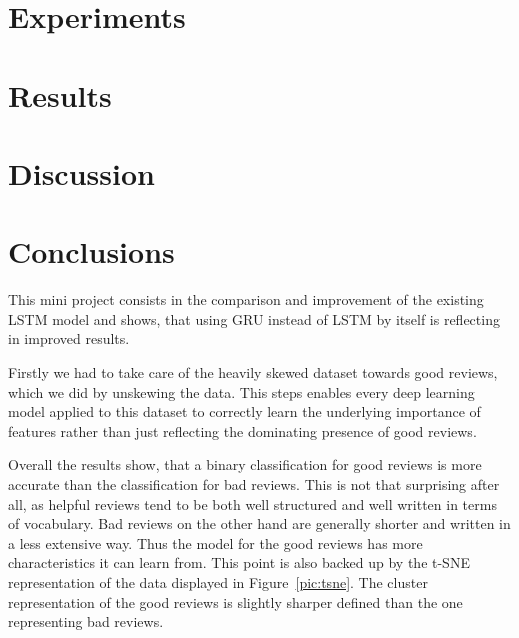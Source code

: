 \documentclass[a4paper,11pt]{article}
\begin{document}
\section{Experiments}


\section{Results}


\section{Discussion}


\section{Conclusions}

This mini project consists in the comparison and improvement of the existing LSTM model \cite{wei} and shows, that using GRU instead of LSTM by itself is reflecting in improved results. 
 
Firstly we had to take care of the heavily skewed dataset towards good reviews, which we did by unskewing the data. This steps enables every deep learning model applied to this dataset to correctly learn the underlying importance of features rather than just reflecting the dominating presence of good reviews.

Overall the results show, that a binary classification for good reviews is more accurate than the classification for bad reviews. This is not that surprising after all, as helpful reviews tend to be both well structured and well written in terms of vocabulary. Bad reviews on the other hand are generally shorter and written in a less extensive way. Thus the model for the good reviews has more characteristics it can learn from. This point is also backed up by the t-SNE representation of the data displayed in Figure~\ref{pic:tsne}. The cluster representation of the good reviews is slightly sharper defined than the one representing bad reviews.
\end{document}

